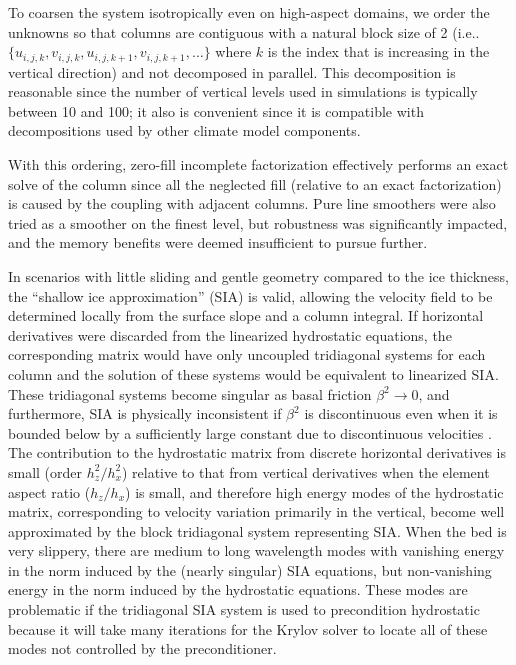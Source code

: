 \documentclass[draft,lineno,jgrga]{AGUTeX}
\makeatletter
\DeclareRobustCommand\onedot{\futurelet\@let@token\@onedot}
\def\@onedot{\ifx\@let@token.\else.\null\fi\xspace}
\def\ie{{i.e}\onedot} \def\Ie{{I.e}\onedot}
\makeatother
\begin{document}
\begin{article}
To coarsen the system isotropically even on high-aspect domains, we order the unknowns so that columns
are contiguous with a natural block size of 2
(\ie $\{u_{i,j,k},v_{i,j,k},u_{i,j,k+1},v_{i,j,k+1},\dotsc\}$ where $k$ is the index that is
increasing in the vertical direction) and not decomposed in parallel.  This decomposition is
reasonable since the number of vertical levels used in simulations is typically between 10 and 100;
it also is convenient since it is compatible with decompositions used by other climate model components.

With this ordering, zero-fill incomplete factorization effectively performs an exact solve of the
column since all the neglected fill (relative to an exact factorization) is caused by the coupling
with adjacent columns.  Pure line smoothers were also tried as a smoother on the finest level, but
robustness was significantly impacted, and the memory benefits were deemed insufficient to pursue
further.

In scenarios with little sliding and gentle geometry compared to the ice thickness, the ``shallow ice approximation'' (SIA) is valid, allowing the velocity field to be determined locally from the surface slope and a column integral.
If horizontal derivatives were discarded from the linearized hydrostatic equations, the corresponding matrix would have only uncoupled tridiagonal systems for each column and the solution of these systems would be equivalent to linearized SIA.
These tridiagonal systems become singular as basal friction $\beta^2 \to 0$, and furthermore, SIA is physically inconsistent if $\beta^2$ is discontinuous even when it is bounded below by a sufficiently large constant due to discontinuous velocities \citep{fowler2001modelling}.
The contribution to the hydrostatic matrix from discrete horizontal derivatives is small (order $h_z^2/h_x^2$) relative to that from vertical derivatives when the element aspect ratio ($h_z/h_x$) is small, and therefore high energy modes of the hydrostatic matrix, corresponding to velocity variation primarily in the vertical, become well approximated by the block tridiagonal system representing SIA.
When the bed is very slippery, there are medium to long wavelength modes with vanishing energy in the norm induced by the (nearly singular) SIA equations, but non-vanishing energy in the norm induced by the hydrostatic equations.
These modes are problematic if the tridiagonal SIA system is used to precondition hydrostatic because it will take many iterations for the Krylov solver to locate all of these modes not controlled by the preconditioner.


\end{article}
\end{document}
